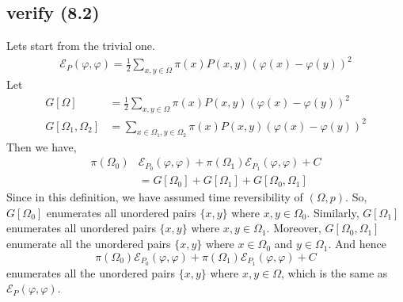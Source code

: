 \documentclass{article}
\begin{document}
\subsection{verify (8.2)}
Lets start from the trivial one.
\begin{align*}
  \mathcal{E}_P(\varphi, \varphi) = \frac{1}{2} \sum_{x, y\in\Omega}\pi(x)P(x, y)(\varphi(x) - \varphi(y))^2
\end{align*}
Let
\begin{align*}
  G[\Omega] &= \frac{1}{2} \sum_{x, y\in\Omega} \pi(x)P(x, y)(\varphi(x) - \varphi(y))^2 \\
  G[\Omega_1, \Omega_2] &= \sum_{x\in\Omega_1,y\in\Omega_2} \pi(x)P(x,y)(\varphi(x) - \varphi(y))^2
\end{align*}
Then we have,
\begin{align*}
  \pi(\Omega_0)&\mathcal{E}_{P_0} (\varphi, \varphi) + \pi(\Omega_1)\mathcal{E}_{P_1}(\varphi, \varphi) + C \\
  &= G[\Omega_0] + G[\Omega_1] + G[\Omega_0, \Omega_1]
\end{align*}
Since in this definition, we have assumed time reversibility of $(\Omega, p)$.
So, $G[\Omega_0]$ enumerates all unordered pairs $\{x, y\}$ where $x, y\in\Omega_0$.
Similarly, $G[\Omega_1]$ enumerates all unordered pairs $\{x, y\}$ where $x, y\in\Omega_1$.
Moreover, $G[\Omega_0, \Omega_1]$ enumerate all the unordered pairs $\{x, y\}$ where $x\in\Omega_0$ and $y\in\Omega_1$.
And hence
\[\pi(\Omega_0)\mathcal{E}_{P_0}(\varphi, \varphi) + \pi(\Omega_1)\mathcal{E}_{P_1}(\varphi, \varphi) + C\]
enumerates all the unordered pairs $\{x, y\}$ where $x, y\in\Omega$, which is the same as $\mathcal{E}_{P}(\varphi, \varphi)$.

\newcommand{\E}{\mathbb{E}}
\newcommand{\Var}{\mathrm{Var}}
\end{document}
